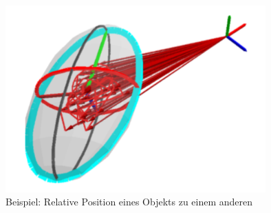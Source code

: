 \begin{figure}
	\centering
	\includegraphics[width=10cm]{bilder/relation.pdf}
	\caption{Beispiel: Relative Position eines Objekts zu einem anderen \cite{gehrung14}}
	\label{img:relation}
\end{figure}

